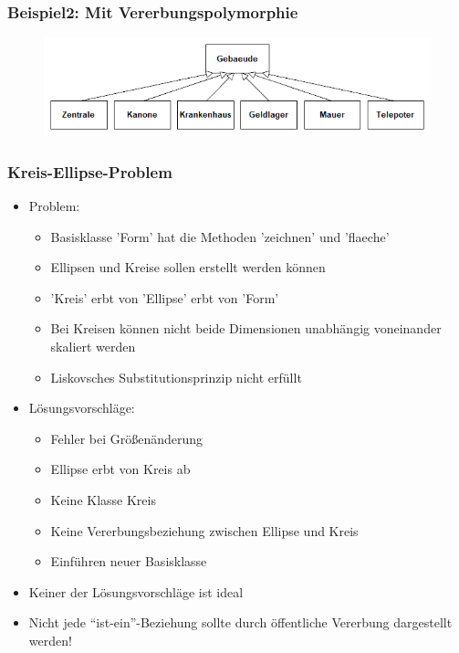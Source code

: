 \begin{frame}
	\frametitle{Beispiel2: Mit Vererbungspolymorphie}
	\begin{figure}[H]
		\includegraphics[width=\textwidth]{polymorphie/universell/vererbung/beispiele/snake/gebaeude.png}
	\end{figure}
	{\tiny\UseRawInputEncoding{}}
\end{frame}

\begin{frame}
	\frametitle{Kreis-Ellipse-Problem}
	\begin{itemize}
		\item Problem:
		\begin{itemize}
			\item Basisklasse 'Form' hat die Methoden 'zeichnen' und 'flaeche'
			\item Ellipsen und Kreise sollen erstellt werden können
			\item 'Kreis' erbt von 'Ellipse' erbt von 'Form'
			\item Bei Kreisen können nicht beide Dimensionen unabhängig voneinander skaliert werden
			\item Liskovsches Substitutionsprinzip nicht erfüllt
		\end{itemize}
		
		\item Lösungsvorschläge:
		\begin{itemize}
			\item Fehler bei Größenänderung
			\item Ellipse erbt von Kreis ab
			\item Keine Klasse Kreis
			\item Keine Vererbungsbeziehung zwischen Ellipse und Kreis
			\item Einführen neuer Basisklasse
		\end{itemize}
		
		\item Keiner der Lösungsvorschläge ist ideal
		\item Nicht jede ``ist-ein''-Beziehung sollte durch öffentliche Vererbung dargestellt werden!
	\end{itemize}
\end{frame}


